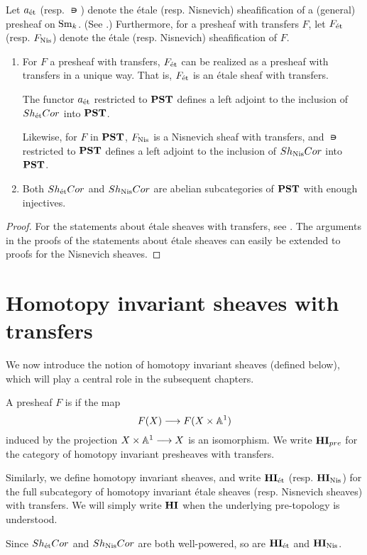 Let $a_{\mathrm{\acute{e}t}}$ (resp. $\nis$) denote the \'etale (resp. Nisnevich)
sheafification of a (general) presheaf on $\mathrm{Sm}_{k}$. (See
\cite[3.1.1]{Tamme}.) Furthermore, for a presheaf with transfers $F$,
let $F_{\mathrm{\acute{e}t}}$ (resp. $F_{\mathrm{Nis}}$) denote the \'etale (resp.
Nisnevich) sheafification of $F$.

\begin{prop}\label{prop_et_and_nis_sheafification}
\begin{enumerate}
\item For $F$ a presheaf with transfers, $F_{\mathrm{\acute{e}t}}$ can be
realized as a presheaf with transfers in a unique way. That is, 
$F_{\mathrm{\acute{e}t}}$ is an \'etale sheaf with transfers.

The functor $a_{\mathrm{\acute{e}t}}$ restricted to $\mathbf{PST}$ defines a left adjoint
to the inclusion of $Sh_{\mathrm{\acute{e}t}}Cor$ into $\mathbf{PST}$. 

Likewise, for $F$ in $\mathbf{PST}$, $F_{\mathrm{Nis}}$ is a Nisnevich sheaf with
transfers, and $\nis$ restricted to $\mathbf{PST}$ defines a left adjoint 
to the inclusion of $Sh_{\mathrm{Nis}}Cor$ into $\mathbf{PST}$. 

\item Both $Sh_{\mathrm{\acute{e}t}}Cor$ and $Sh_{\mathrm{Nis}}Cor$ are abelian 
subcategories of $\mathbf{PST}$ with enough injectives.
\end{enumerate}
\end{prop}
\begin{proof}
For the statements about \'etale sheaves with transfers, see 
\cite[6.17, 6.18 and 6.19]{MVW}. The arguments in the proofs of the
statements about \'etale sheaves can easily be extended to proofs
for the Nisnevich sheaves.
\end{proof}

\section{Homotopy invariant sheaves with transfers}

We now introduce the notion of homotopy invariant sheaves (defined
below), which will play a central role in the subsequent chapters.

\begin{defn}
A presheaf $F$ is  if the map 
\[
F(X) \longrightarrow F(X \times \mathbb{A}^1)
\]
induced by the projection $X \times \mathbb{A}^1 \longrightarrow X$ is an isomorphism.
We write $\mathbf{HI}_{pre}$ for the category of homotopy invariant 
presheaves with transfers.

Similarly, we define homotopy invariant sheaves, and write $\mathbf{HI}_{\mathrm{\acute{e}t}}$ 
(resp. $\mathbf{HI}_{\mathrm{Nis}}$) for the full subcategory of homotopy invariant 
\'etale sheaves (resp. Nisnevich sheaves) with transfers. We will 
simply write $\mathbf{HI}$ when the underlying pre-topology is understood.

Since $Sh_{\mathrm{\acute{e}t}}Cor$ and $Sh_{\mathrm{Nis}}Cor$ are both well-powered, so are 
$\mathbf{HI}_{\mathrm{\acute{e}t}}$ and $\mathbf{HI}_{\mathrm{Nis}}$.
\end{defn}

